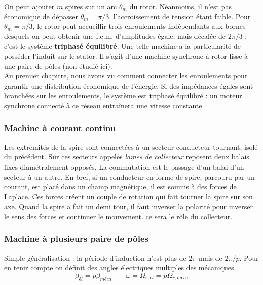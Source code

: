 		On peut ajouter $m$ spires sur un arc $\theta_m$ du rotor. 
		Néanmoins, 	il n'est pas économique de dépasser $\theta_m = 
		\pi/3$, l'accroissement de tension étant faible. Pour $\theta_m = 
		\pi/3$, le rotor peut accueillir trois enroulements indépendants 
		aux bornes desquels on peut obtenir une f.e.m. d'amplitudes 
		égale, mais décalée de $2\pi/3$ : c'est le système \textbf{triphasé 
		équilibré}. Une telle machine a la particularité de posséder l'induit sur 
		le stator. Il s'agit d'une machine synchrone à rotor lisse à 
		une paire de pôles (non-étudié ici).\\
		
		Au premier chapitre, nous avons vu comment connecter les enroulements 
		pour garantir une distribution économique de l'énergie. Si des 
		impédances égales sont branchées sur les enroulements, le système 
		est triphasé équilibré : un moteur synchrone connecté à ce réseau 
		entraînera une vitesse constante.
		
		
		\subsubsection{Machine à courant continu}
		Les extrémités de la spire sont connectées à un secteur conducteur 
		tournant, isolé du précédent. Sur ces secteurs appelés \textit{lames 
		de collecteur} reposent deux balais fixes diamétralement opposés. La 
		commutation est le passage d'un balai d'un secteur à un autre. En bref, 
		si un conducteur en forme de spire, parcouru par un courant, est placé
		dans un champ magnétique, il est soumis à des forces de Laplace. Ces forces 
		créent un couple de rotation qui fait tourner la spire sur son axe. Quand 
		la spire a fait un demi tour, il faut inverser la polarité pour inverser le 
		sens des forces et continuer le mouvement. ce sera le rôle du collecteur.
		
		\subsubsection{Machine à plusieurs paire de pôles}
		Simple généralisation : la période d'induction n'est plus de $2\pi$ mais 
		de $2\pi/p$. Pour en tenir compte on définit des angles électriques multiples des mécaniques
		\begin{equation}
			\beta _{él} = p\beta _{méca} \qquad \omega = \Omega _{r,él} = p\Omega _{r,méca}
		\end{equation}
		
		
		
